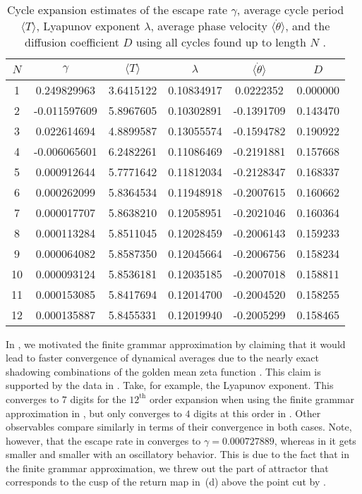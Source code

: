 \begin{table}
    \caption{Cycle expansion estimates of the escape rate $\gamma$, average
    cycle period $\langle T \rangle$, Lyapunov exponent $\lambda$, average
    phase velocity $\langle \dot{\theta} \rangle$, and the diffusion coefficient
    $D$ using all cycles found up to length $N$ .}
    \label{t-DynamicalAveragesNoGrammar}
    \begin{tabular}{c|c|c|c|c|c}
     $N$ & $\gamma$ & $\langle T \rangle$ & $\lambda$ & $\langle \dot{\theta} \rangle$ & $D$ \\
    \hline
    1 & 0.249829963 & 3.6415122 & 0.10834917 & 0.0222352 &  0.000000 \\
    2 & -0.011597609 & 5.8967605 & 0.10302891 & -0.1391709 &  0.143470 \\
    3 & 0.022614694 & 4.8899587 & 0.13055574 & -0.1594782 &  0.190922 \\
    4 & -0.006065601 & 6.2482261 & 0.11086469 & -0.2191881 &  0.157668 \\
    5 & 0.000912644 & 5.7771642 & 0.11812034 & -0.2128347 &  0.168337 \\
    6 & 0.000262099 & 5.8364534 & 0.11948918 & -0.2007615 &  0.160662 \\
    7 & 0.000017707 & 5.8638210 & 0.12058951 & -0.2021046 &  0.160364 \\
    8 & 0.000113284 & 5.8511045 & 0.12028459 & -0.2006143 &  0.159233 \\
    9 & 0.000064082 & 5.8587350 & 0.12045664 & -0.2006756 &  0.158234 \\
    10 & 0.000093124 & 5.8536181 & 0.12035185 & -0.2007018 &  0.158811 \\
    11 & 0.000153085 & 5.8417694 & 0.12014700 & -0.2004520 &  0.158255 \\
    12 & 0.000135887 & 5.8455331 & 0.12019940 & -0.2005299 &  0.158465 \\
    \end{tabular}
\end{table}
In , we motivated the finite grammar approximation by
claiming that it would lead to faster convergence of dynamical averages 
due to the nearly exact shadowing combinations of the golden mean zeta function
. This claim is supported by the data
in . Take, for example, the
Lyapunov exponent. This converges to $7$ digits for the $12^{\mathrm{th}}$ order
expansion when using the finite grammar approximation in
, but only converges to $4$ digits at this order in
. Other observables compare similarly in
terms of their convergence in both cases. Note, however, that the escape rate
in  converges to $\gamma = 0.000727889$, whereas
in  it gets smaller and smaller with an
oscillatory behavior. This is due to the fact that in the finite grammar
approximation, we threw out the part of attractor that corresponds to the
cusp of the return map in \,(d) above the point cut 
by .

